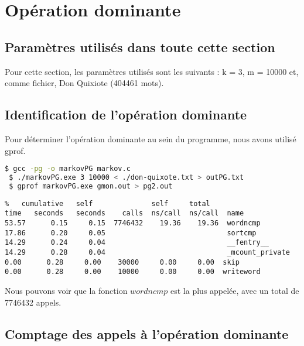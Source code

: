
\section{Opération dominante}

\subsection{Paramètres utilisés dans toute cette section}

Pour cette section, les paramètres utilisés sont les suivants : k = 3, m = 10000 et, comme fichier, Don Quixiote (404461 mots).
\clearpage
\subsection{Identification de l'opération dominante}

Pour déterminer l'opération dominante au sein du programme, nous avons utilisé gprof.


\begin{lstlisting}[language=bash]
 $ gcc -pg -o markovPG markov.c
 $ ./markovPG.exe 3 10000 < ./don-quixote.txt > outPG.txt
 $ gprof markovPG.exe gmon.out > pg2.out
\end{lstlisting}

\begin{verbatim}
%   cumulative   self              self     total           
time   seconds   seconds    calls  ns/call  ns/call  name    
53.57      0.15     0.15  7746432    19.36    19.36  wordncmp
17.86      0.20     0.05                             sortcmp
14.29      0.24     0.04                             __fentry__
14.29      0.28     0.04                             _mcount_private
0.00      0.28     0.00    30000     0.00     0.00  skip
0.00      0.28     0.00    10000     0.00     0.00  writeword
\end{verbatim}
Nous pouvons voir que la fonction $wordncmp$ est la plus appelée, avec un total de 7746432 appels.





\subsection{Comptage des appels à l'opération dominante}

